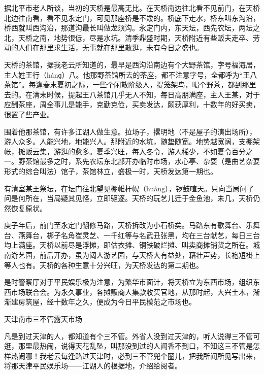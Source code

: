 \documentclass[12pt,UTF8]{ctexbook}
\begin{document}
据北平市老人所谈，当初的天桥是最高无比。在天桥南边往北看不见前门，在天桥北边往南看，看不见永定门，可见那座桥是不矮的。桥底下走水，桥东叫东沟沿，桥西就叫西沟沿，那道沟最长叫做龙须沟。永定门内，东天坛，西先农坛，两坛之北，天桥之南，地势很低，尽是水坑。清季鼎盛时期，天桥附近有些贩夫走卒、劳动的人们在那里求生活，无事就在那里散逛，未有今日之盛也。

天桥的茶馆，据我老云所知道的，最早是西沟沿南边有个大野茶馆，字号福海居，主人姓王行（hánɡ）八。他那野茶馆所去的茶座，都不注意字号，全都呼为“王八茶馆”。每逢春末夏初之际，一些个闲散阶级人，提笼架鸟，喝个野茶，都到那里去的。在清末时候，提起王八茶馆几乎无人不知，每日高朋满座，主人王某，对于应酬茶座，周全事儿是能手，克勤克俭，买卖发达，颇获厚利，十数年的好买卖，很置了些产业。

围着他那茶馆，有许多江湖人做生意。拉场子，撂明地（不是屋子的演出场所），游人众多。人能兴地，地能兴人。那附近的水坑，随垫随宽。地势越宽阔，支棚架帐，摊贩云集，游逛的愈多。夏季兴旺，每入冬令，游人稀少，不如夏令百分之一。野茶馆最多之时，系先农坛东北部开办临时市场，水心亭、杂耍（是曲艺杂耍形式的综合叫法）馆子，茶馆林立，盛极一时，天桥发达第一期也。

有清室某王祭坛，在坛门往北望见棚帷杆幌（huàng），锣鼓喧天。只向当局问了问是何所在，当局疑其见怪，立即驱逐。天桥的玩艺儿迁于金鱼池，未几，天桥仍然恢复原状。

庚子年后，前门至永定门翻修马路，天桥拆改为小石桥矣。马路东有歌舞台、乐舞台、燕舞台，梆子名角崔灵芝、一千红等与名武丑张黑，均在三台献艺，每日三台均上满座。天桥以前尽是浮摊，即估衣摊、铜铁破烂摊、叫卖商摊销货之所在。城南游艺园，前后开办，虽为阔人游艺园，与天桥大有益处，藉壮声势，长袍短褂上等人也有。天桥的各种生意十分兴旺，为天桥发达的第二期也。

是时警察厅对于平民娱乐极为注意，为繁华市面计，将天桥立为东西市场，组织东西市场联合会。为永久事业，各摊贩商人集款收买官地，从那时起，大兴土木，渐渐建房筑屋，经十数年之久，便成为今日平民模范之市场也。





天津南市三不管露天市场


凡是到过天津的人，都知道有个三不管。外省人没到过天津的，听人说得三不管可逛，那里最热闹，说得天花乱坠，叫那没到过的人闻香不到口，不知这三不管是怎样热闹哪！我老云每逢路过天津时，必到三不管兜个圈儿，把我所闻所见写出来，将那天津平民娱乐场——江湖人的根据地，介绍给阅者。
\end{document}
